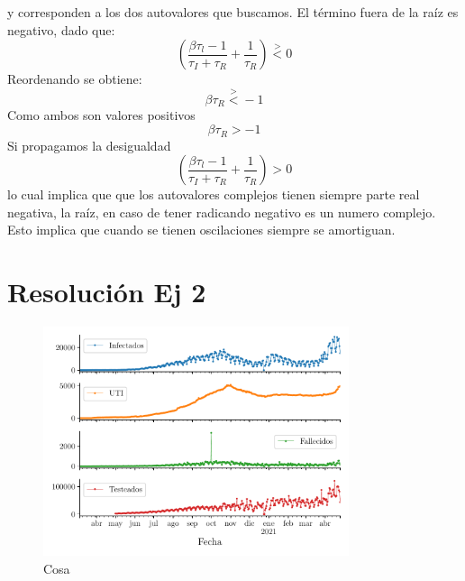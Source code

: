 \documentclass[twocolumn,aps,prl]{revtex4-1}
\begin{document}


y corresponden a los dos autovalores que buscamos. El término fuera de la raíz es negativo, dado que:
$$
\left(\frac{\beta \tau_{l}-1}{\tau_{I}+\tau_{R}}+\frac{1}{\tau_{R}}\right) 
\stackrel{>}{<} 0
$$
Reordenando se obtiene:
$$
\beta \tau_{R}
\stackrel{>}{<} -1
$$
Como ambos son valores positivos 
$$
\beta \tau_{R}
> -1
$$
Si propagamos la desigualdad
$$
\left(\frac{\beta \tau_{l}-1}{\tau_{I}+\tau_{R}}+\frac{1}{\tau_{R}}\right) 
> 0
$$
lo cual implica que que los autovalores complejos tienen siempre parte real negativa, la raíz, en caso de tener radicando negativo es un numero complejo. Esto implica que cuando se tienen oscilaciones siempre se amortiguan. 

\section{Resolución Ej 2}

\begin{figure}[!ht]
  \centering
    \includegraphics[width = 0.8\textwidth]{figuras/ex02-resumen.pdf}
    \caption{Cosa}
    \label{fig:ex02Resumen}
\end{figure}
\end{document}
